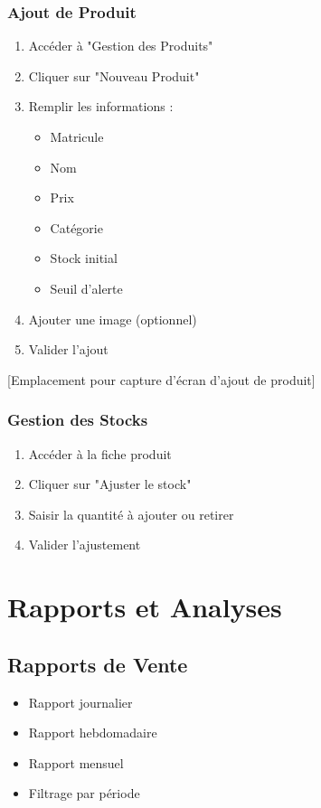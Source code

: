 \documentclass[14pt,a4paper]{report}
\begin{document}
\subsection{Ajout de Produit}
\begin{enumerate}
    \item Accéder à "Gestion des Produits"
    \item Cliquer sur "Nouveau Produit"
    \item Remplir les informations :
        \begin{itemize}
            \item Matricule
            \item Nom
            \item Prix
            \item Catégorie
            \item Stock initial
            \item Seuil d'alerte
        \end{itemize}
    \item Ajouter une image (optionnel)
    \item Valider l'ajout
\end{enumerate}

[Emplacement pour capture d'écran d'ajout de produit]

\subsection{Gestion des Stocks}
\begin{enumerate}
    \item Accéder à la fiche produit
    \item Cliquer sur "Ajuster le stock"
    \item Saisir la quantité à ajouter ou retirer
    \item Valider l'ajustement
\end{enumerate}

\chapter{Rapports et Analyses}

\section{Rapports de Vente}
\begin{itemize}
    \item Rapport journalier
    \item Rapport hebdomadaire
    \item Rapport mensuel
    \item Filtrage par période
\end{itemize}
\end{document}
